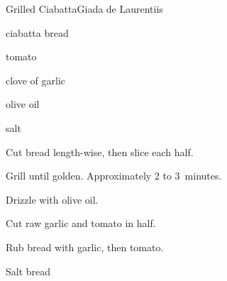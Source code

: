 \begin{recipe}{Grilled Ciabatta}{Giada de Laurentiis}{}

\begin{ingredients}
\item ciabatta bread
\item tomato
\item clove of garlic
\item olive oil
\item salt
\end{ingredients}

\begin{directions}
\item Cut bread length-wise, then slice each half.
\item Grill until golden. Approximately 2 to 3~minutes.
\item Drizzle with olive oil.
\item Cut raw garlic and tomato in half.
\item Rub bread with garlic, then tomato.
\item Salt bread
\end{directions}

\end{recipe}
